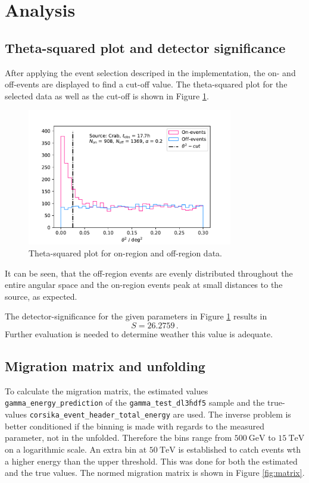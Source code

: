 \section{Analysis}
\label{sec:auswertung}

\subsection{Theta-squared plot and detector significance}
After applying the event selection descriped in the implementation, the on- and off-events are
displayed to find a cut-off value.
The theta-squared plot for the selected data as well as the cut-off is shown in Figure \ref{fig:onoff}.

\begin{figure}[H]
  \centering
  \includegraphics[width=0.8\textwidth]{plots/On_Off2.pdf}
  \caption{Theta-squared plot for on-region and off-region data.}
  \label{fig:onoff}
\end{figure}

It can be seen, that the off-region events are evenly distributed throughout the entire angular space and the on-region events peak at small distances to the source, as expected.

The detector-significance for the given parameters in Figure \ref{fig:onoff} results in
\begin{equation}
  S = 26.2759\,.
\end{equation}
Further evaluation is needed to determine weather this value is adequate.

\subsection{Migration matrix and unfolding}
To calculate the migration matrix, the estimated values \texttt{gamma\_energy\_prediction} of the \texttt{gamma\_test\_dl3\.hdf5}
sample and the true-values \texttt{corsika\_event\_header\_total\_energy} are used.
The inverse problem is better conditioned if the binning is made with regards to the measured parameter, not in the unfolded.
Therefore the bins range from $\SI{500}{\giga\electronvolt}$ to $\SI{15}{\tera\electronvolt}$ on a logarithmic scale.
An extra bin at $\SI{50}{\tera\electronvolt}$ is established to catch events wth a higher energy than the upper threshold.
This was done for both the estimated and the true values. The normed migration matrix is shown in Figure \ref{fig:matrix}.

